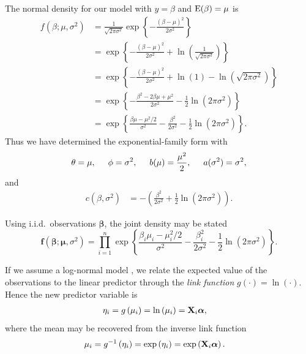 The normal density for our model with $y = \beta$ and $\mathrm{E}(\beta) = \mu$ is
\begin{align*}
  f(\beta; \mu, \sigma^2) &= \frac{1}{\sqrt{2\pi \sigma^2}} \exp\left\{ - \frac{(\beta - \mu)^2}{2\sigma^2} \right\} \\
  &= \exp\left\{ - \frac{(\beta - \mu)^2}{2\sigma^2} + \ln\left( \frac{1}{\sqrt{2\pi \sigma^2}} \right)  \right\} \\
  &= \exp\left\{ - \frac{(\beta - \mu)^2}{2\sigma^2} + \ln(1) - \ln\left( \sqrt{2\pi \sigma^2} \right)  \right\} \\
  &= \exp\left\{ - \frac{\beta^2 - 2\beta \mu + \mu^2}{2\sigma^2} - \frac{1}{2}\ln\left( 2\pi \sigma^2 \right)  \right\} \\
  &= \exp\left\{ \frac{\beta \mu - \mu^2 / 2}{\sigma^2} - \frac{\beta^2}{2\sigma^2} - \frac{1}{2}\ln\left( 2\pi \sigma^2 \right)  \right\}.
\end{align*}
Thus we have determined the exponential-family form with 
\begin{align*}
  \theta = \mu, \hspace{5mm} \phi = \sigma^2, \hspace{5mm} b(\mu) = \frac{\mu^2}{2}, \hspace{5mm} a(\sigma^2) = \sigma^2,
\end{align*}
and
\begin{align*}
  c(\beta,\sigma^2) &= -\left( \frac{\beta^2}{2\sigma^2} + \frac{1}{2}\ln\left( 2\pi \sigma^2 \right) \right).
\end{align*}

Using i.i.d.\ observations $\bm{\beta}$, the joint density may be stated
$$\bm{f}(\bm{\beta}; \bm{\mu}, \sigma^2) = \prod_{i=1}^n \exp\left\{ \frac{\beta_i \mu_i - \mu_i^2 / 2}{\sigma^2} - \frac{\beta_i^2}{2\sigma^2} - \frac{1}{2}\ln\left( 2\pi \sigma^2 \right)  \right\}.$$

If we assume a log-normal model \citep{hardin_2012}, we relate the expected value of the observations to the linear predictor through the \emph{link function} $g\left(\cdot\right) = \ln\left(\cdot\right)$.  Hence the new predictor variable is
\begin{align*}
  \eta_i &= g\left(\mu_i\right) = \ln\left(\mu_i\right) = \mathbf{X}_i \bm{\alpha},
\end{align*}
where the mean may be recovered from the inverse link function
\begin{align*}
  \mu_i &= g^{-1}\left(\eta_i\right) = \exp\left(\eta_i\right) = \exp\left( \mathbf{X}_i \bm{\alpha} \right).
\end{align*}


